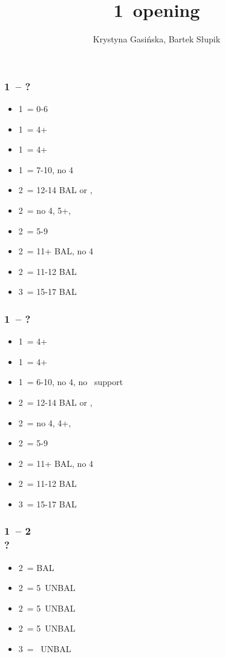 \documentclass[12pt, a4paper]{article}
\title{1\mins\ opening}
\author{Krystyna Gasińska, Bartek Słupik}
\begin{document}
\maketitle


\subsubsection*{1\clubs\ -- ?}
\begin{itemize}
    \item 1\diams\ = 0-6
    \item 1\hearts\ = 4+\hearts
    \item 1\spades\ = 4+\spades
    \item 1\ntx\ = 7-10, no 4\majs
    \item 2\clubs\ = 12-14 BAL or \clubs, \gf
    \item 2\diams\ = no 4\majs, 5+\diams, \gf
    \item 2\hearts\ = 5-9
    \item 2\spades\ = 11+ BAL, no 4\majs
    \item 2\ntx\ = 11-12 BAL
    \item 3\nt\ = 15-17 BAL
\end{itemize}

\subsubsection*{1\diams\ -- ?}
\begin{itemize}
    \item 1\hearts\ = 4+\hearts
    \item 1\spades\ = 4+\spades
    \item 1\ntx\ = 6-10, no 4\majs, no \diams\ support
    \item 2\clubs\ = 12-14 BAL or \clubs, \gf
    \item 2\diams\ = no 4\majs, 4+\diams, \gf
    \item 2\hearts\ = 5-9
    \item 2\spades\ = 11+ BAL, no 4\majs
    \item 2\ntx\ = 11-12 BAL
    \item 3\nt\ = 15-17 BAL
\end{itemize}

\subsubsection*{1\clubs\ -- 2\clubs \\ ?}
\begin{itemize}
    \item 2\diams\ = BAL
    \item 2\hearts\ = 5\hearts\ UNBAL
    \item 2\spades\ = 5\spades\ UNBAL
    \item 2\nt\ = 5\diams\ UNBAL
    \item 3\clubs\ = \clubs\ UNBAL
\end{itemize}
\end{document}
